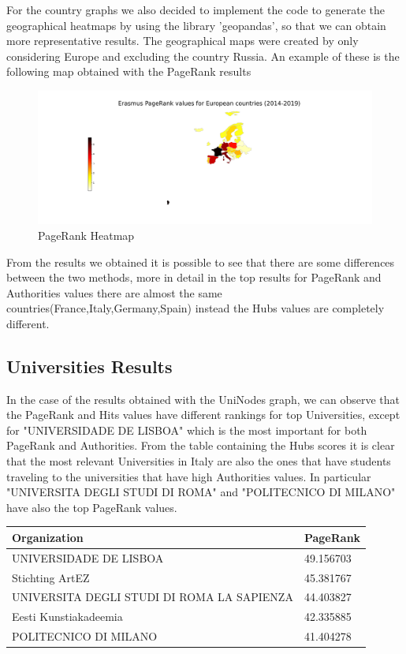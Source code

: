     For the country graphs we also decided to implement the code to generate the geographical heatmaps by using the library
    'geopandas', so that we can obtain more representative results.
    The geographical maps were created by only considering Europe and excluding the country Russia.
    An example of these is the following map obtained with the PageRank results

    \begin{figure}[H]
        \centering
          \includegraphics[width=\linewidth]{../geoMaps/PR_geoMap.png}
          \caption{PageRank Heatmap}
         \label{fig:1}
        \end{figure}     

    From the results we obtained it is possible to see that there are some differences between the two methods,
    more in detail in the top results for PageRank and Authorities values there are almost the same countries(France,Italy,Germany,Spain)
     instead the Hubs values are completely different.
    
    \subsection*{Universities Results}
    In the case of the results obtained with the UniNodes graph, we can observe that the PageRank and Hits values 
    have different rankings for top Universities, except for "UNIVERSIDADE DE LISBOA" which is the most important
    for both PageRank and Authorities.
    From the table containing the Hubs scores it is clear that the most relevant Universities in Italy are also the 
    ones that have students traveling to the universities that have high Authorities values. 
    In particular "UNIVERSITA DEGLI STUDI DI ROMA" and "POLITECNICO DI MILANO" have also the top PageRank values.    
    \begin{table}[hbtp]
      \parbox{.25\linewidth}{
        \centering
        \begin{tabular}{l l}
            \hline
            \textbf{Organization} & \textbf{PageRank} \\ \hline
            UNIVERSIDADE DE LISBOA & 49.156703 \\
            Stichting ArtEZ & 45.381767 \\
            UNIVERSITA DEGLI STUDI DI ROMA LA SAPIENZA & 44.403827 \\
            Eesti Kunstiakadeemia & 42.335885 \\
            POLITECNICO DI MILANO & 41.404278\\\hline
          \end{tabular}
          \label{tab:table-label}
        }
      \end{table}

